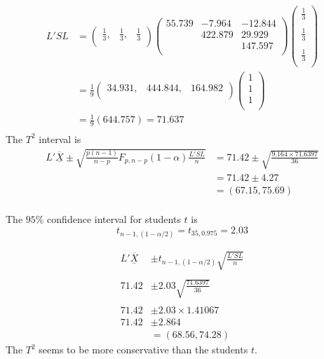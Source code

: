 \documentclass[11pt,a4paper]{article}
\theoremstyle{definition}
\begin{document}
\begin{enumerate}
\begin{align*}
L'SL & = \begin{pmatrix}
\frac{1}{3}, & \frac{1}{3}, & \frac{1}{3}\\
\end{pmatrix}
\begin{pmatrix}
55.739 & -7.964 & -12.844\\
       &  422.879 & 29.929\\
       &          & 147.597\\
\end{pmatrix}
 \begin{pmatrix}
\frac{1}{3}\\\\ \frac{1}{3} \\\\ \frac{1}{3}\\
\end{pmatrix}\\
& = \frac{1}{9}\begin{pmatrix}
34.931, & 444.844, & 164.982\\
\end{pmatrix}
\begin{pmatrix}
1\\ 1\\ 1\\
\end{pmatrix}\\
& = \frac{1}{9}(644.757) = 71.637\\
\end{align*}
The $T^2$ interval is 
\begin{align*}
L'\overline{\underline{X}} \pm \sqrt{\frac{p(n-1)}{n-p}F_{p,n-p}(1-\alpha)\frac{L'SL}{n}} & = 71.42 \pm \sqrt{\frac{9.164\times 71.6397}{36}}\\
& = 71.42 \pm 4.27\\
& = (67.15, 75.69)\\
\end{align*}


 The $95\%$ confidence interval for students $t$ is
 $$t_{n-1,(1-\alpha/2)} = t_{35,0.975} = 2.03$$
 
\begin{align*}
 L'\overline{\underline{X}} & \pm t_{n-1,(1-\alpha/2)}\sqrt{\frac{L'SL}{n}}\\\\
 71.42 & \pm 2.03 \sqrt{\frac{71.6397}{36}}\\\\
 71.42 & \pm 2.03 \times 1.41067\\
 71.42 & \pm 2.864\\
 & = (68.56, 74.28)
\end{align*}
The $T^2$ seems to be more conservative than the students $t$.\\



\end{enumerate}
\end{document}
